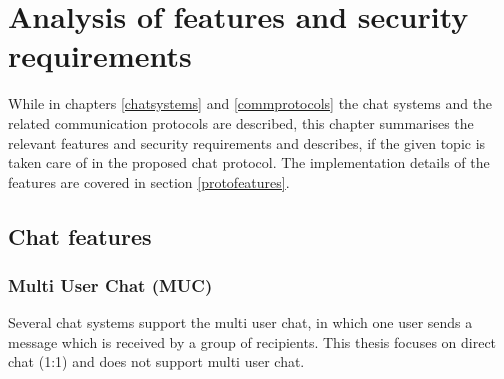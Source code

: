\chapter{Analysis of features and security requirements}
\label{requirements}
While in chapters \ref{chatsystems} and \ref{commprotocols}
the chat systems and the related communication protocols
are described, this chapter summarises the relevant features
and security requirements and describes, if the
given topic is taken care of in the proposed chat protocol.
The implementation details of the features are covered in
section \ref{protofeatures}.
\section{Chat features}
\subsection{Multi User Chat (MUC)}
Several chat systems support the multi user chat, in which one user sends a message
which is received by a group of recipients.
This thesis focuses on direct chat (1:1) and does not support multi user chat.
